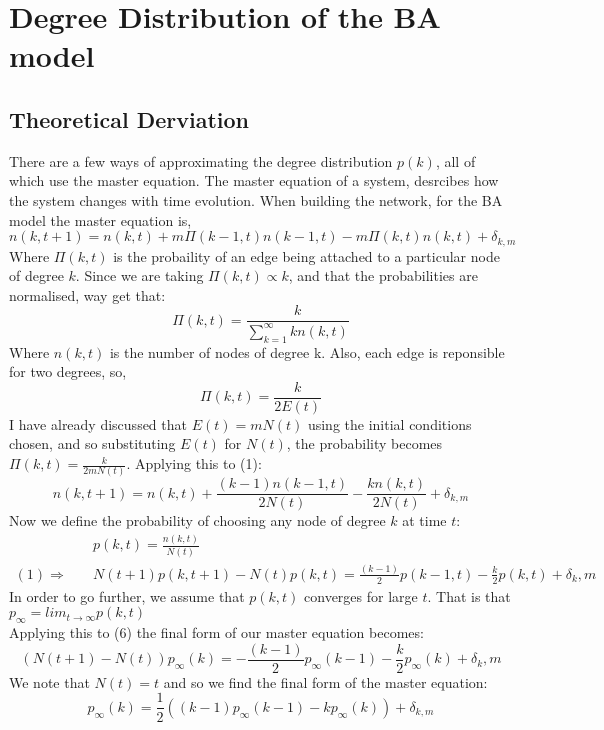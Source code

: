 \documentclass[]{article}
\begin{document}
\section{Degree Distribution of the BA model}
\subsection{Theoretical Derviation}
There are a few ways of approximating the degree distribution $p(k)$, all of which use the master equation. The master equation of a system, desrcibes how the system changes with time evolution. When building the network, for the BA model the master equation is,
\begin{equation}
n(k,t+1)=n(k,t)+m\Pi(k-1,t)n(k-1,t)-m\Pi(k,t)n(k,t)+\delta_{k,m}
\end{equation}
Where $\Pi(k,t)$ is the probaility of an edge being attached to a particular node of degree $k$.
Since we are taking $\Pi(k,t) \propto k$, and that the probabilities are normalised, way get that:
\begin{equation}
\Pi(k,t)=\frac{k}{\sum_{k=1}^{\infty}{kn(k,t)}}
\end{equation}
Where $n(k,t)$ is the number of nodes of degree k. Also, each edge is reponsible for two degrees, so,
\begin{equation}
\Pi(k,t)=\frac{k}{2E(t)}
\end{equation}
I have already discussed that $E(t)=mN(t)$ using the initial conditions chosen, and so substituting $E(t)$ for $N(t)$, the probability becomes  $\Pi(k,t)=\frac{k}{2mN(t)}$. Applying this to (1):
\begin{equation}
n(k,t+1)=n(k,t)+\frac{(k-1)n(k-1,t)}{2N(t)}-\frac{kn(k,t)}{2N(t)}+\delta_{k,m}
\end{equation}
Now we define the probability of choosing any node of degree $k$ at time $t$: 
\begin{align}
&p(k,t)=\frac{n(k,t)}{N(t)}\\
(1) \Rightarrow \quad &N(t+1)p(k,t+1)-N(t)p(k,t)=\frac{(k-1)}{2}p(k-1,t)-\frac{k}{2}p(k,t)+ \delta_k,m
\end{align}
In order to go further, we assume that $p(k,t)$ converges for large $t$. That is that $p_{\infty}=lim_{t \rightarrow \infty} p(k,t)$\\Applying this to (6) the final form of our master equation becomes:
\begin{equation}
(N(t+1)-N(t))p_{\infty}(k)=-\frac{(k-1)}{2}p_{\infty}(k-1)-\frac{k}{2}p_{\infty}(k)+ \delta_k,m
\end{equation}
We note that $N(t)=t$  and so we find the final form of the master equation:
\begin{equation}
p_{\infty}(k)=\frac{1}{2}((k-1)p_{\infty}(k-1)-kp_{\infty}(k)) +\delta_{k,m}
\end{equation}
\end{document}
